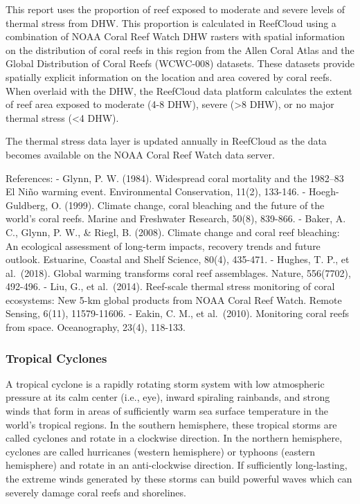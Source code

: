 \documentclass[
  letterpaper,
  DIV=11,
  numbers=noendperiod]{scrartcl}
\begin{document}
This report uses the proportion of reef exposed to moderate and severe
levels of thermal stress from DHW. This proportion is calculated in
ReefCloud using a combination of NOAA Coral Reef Watch DHW rasters with
spatial information on the distribution of coral reefs in this region
from the Allen Coral Atlas and the Global Distribution of Coral Reefs
(WCWC-008) datasets. These datasets provide spatially explicit
information on the location and area covered by coral reefs. When
overlaid with the DHW, the ReefCloud data platform calculates the extent
of reef area exposed to moderate (4-8 DHW), severe (\textgreater8 DHW),
or no major thermal stress (\textless4 DHW).

The thermal stress data layer is updated annually in ReefCloud as the
data becomes available on the NOAA Coral Reef Watch data server.

References: - Glynn, P. W. (1984). Widespread coral mortality and the
1982--83 El Niño warming event. Environmental Conservation, 11(2),
133-146. - Hoegh-Guldberg, O. (1999). Climate change, coral bleaching
and the future of the world's coral reefs. Marine and Freshwater
Research, 50(8), 839-866. - Baker, A. C., Glynn, P. W., \& Riegl, B.
(2008). Climate change and coral reef bleaching: An ecological
assessment of long-term impacts, recovery trends and future outlook.
Estuarine, Coastal and Shelf Science, 80(4), 435-471. - Hughes, T. P.,
et al.~(2018). Global warming transforms coral reef assemblages. Nature,
556(7702), 492-496. - Liu, G., et al.~(2014). Reef-scale thermal stress
monitoring of coral ecosystems: New 5-km global products from NOAA Coral
Reef Watch. Remote Sensing, 6(11), 11579-11606. - Eakin, C. M., et
al.~(2010). Monitoring coral reefs from space. Oceanography, 23(4),
118-133.

\subsubsection{Tropical Cyclones}\label{tropical-cyclones}

A tropical cyclone is a rapidly rotating storm system with low
atmospheric pressure at its calm center (i.e., eye), inward spiraling
rainbands, and strong winds that form in areas of sufficiently warm sea
surface temperature in the world's tropical regions. In the southern
hemisphere, these tropical storms are called cyclones and rotate in a
clockwise direction. In the northern hemisphere, cyclones are called
hurricanes (western hemisphere) or typhoons (eastern hemisphere) and
rotate in an anti-clockwise direction. If sufficiently long-lasting, the
extreme winds generated by these storms can build powerful waves which
can severely damage coral reefs and shorelines.
\end{document}
